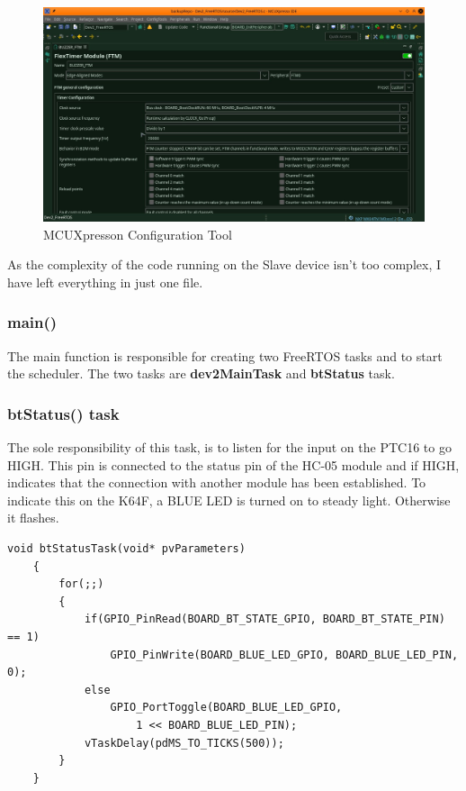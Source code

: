 \documentclass[12pt,a4paper]{article}
\begin{document}
    \begin{figure}[h]
        \centering
        \includegraphics[width=\textwidth]{FlexTimer_config.jpeg}
        \caption{MCUXpresson Configuration Tool}
        \label{fig:flexTimerConfig}
    \end{figure}
    
    As the complexity of the code running on the Slave device isn't too complex, I have left everything in just one file. 
    
    \subsubsection*{main()}
    The main function is responsible for creating two FreeRTOS tasks and to start the scheduler. The two tasks are {\bfseries dev2MainTask} and {\bfseries btStatus} task.
    
    \subsubsection*{btStatus() task}
    The sole responsibility of this task, is to listen for the input on the PTC16 to go HIGH. This pin is connected to the status pin of the HC-05 module and if HIGH, indicates that the connection with another module has been established. To indicate this on the K64F, a BLUE LED is turned on to steady light. Otherwise it flashes. 
    
    \begin{lstlisting}[label={lst:btStatus}, caption=btStatus() task]
    void btStatusTask(void* pvParameters)
    {
        for(;;)
        {
            if(GPIO_PinRead(BOARD_BT_STATE_GPIO, BOARD_BT_STATE_PIN) == 1)
                GPIO_PinWrite(BOARD_BLUE_LED_GPIO, BOARD_BLUE_LED_PIN, 0);
            else
                GPIO_PortToggle(BOARD_BLUE_LED_GPIO, 
                    1 << BOARD_BLUE_LED_PIN);
            vTaskDelay(pdMS_TO_TICKS(500));
        }
    }
    \end{lstlisting}
    
\end{document}
